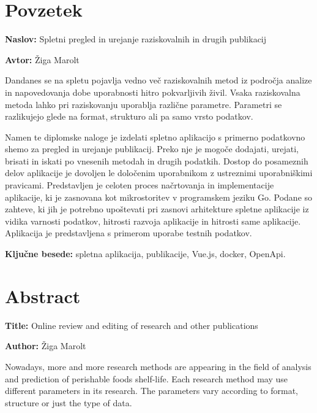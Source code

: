\documentclass[a4paper, 12pt]{book}
\newcommand{\ttitle}{Spletni pregled in urejanje raziskovalnih in drugih publikacij}
\newcommand{\ttitleEn}{Online review and editing of research and other publications}
\newcommand{\tauthor}{Žiga Marolt}
\newcommand{\tkeywords}{spletna aplikacija, publikacije, Vue.js, docker, OpenApi}
\newcommand{\clearemptydoublepage}{\newpage{\pagestyle{empty}\cleardoublepage}}
\begin{document}
\clearemptydoublepage

\chapter*{Povzetek}

\noindent\textbf{Naslov:} \ttitle
\bigskip

\noindent\textbf{Avtor:} \tauthor
\bigskip

\noindent Dandanes se na spletu pojavlja vedno več raziskovalnih metod iz področja analize in napovedovanja dobe uporabnosti hitro pokvarljivih živil. Vsaka raziskovalna metoda lahko pri raziskovanju uporablja različne parametre. Parametri se razlikujejo glede na format, strukturo ali pa samo vrsto podatkov.

Namen te diplomske naloge je izdelati spletno aplikacijo s primerno podatkovno shemo za pregled in urejanje publikacij. Preko nje je mogoče dodajati, urejati, brisati in iskati po vnesenih metodah in drugih podatkih. Dostop do posameznih delov aplikacije je dovoljen le določenim uporabnikom z ustreznimi uporabniškimi pravicami. Predstavljen je celoten proces načrtovanja in implementacije aplikacije, ki je zasnovana kot mikrostoritev v programskem jeziku Go. Podane so zahteve, ki jih je potrebno upoštevati pri zasnovi arhitekture spletne aplikacije iz vidika varnosti podatkov, hitrosti razvoja aplikacije in hitrosti same aplikacije. Aplikacija je predstavljena s primerom uporabe testnih podatkov.

\bigskip

\noindent\textbf{Ključne besede:} \tkeywords.
\clearemptydoublepage

\chapter*{Abstract}

\noindent\textbf{Title:} \ttitleEn
\bigskip

\noindent\textbf{Author:} \tauthor
\bigskip

\noindent Nowadays, more and more research methods are appearing in the field of analysis and prediction of perishable foods shelf-life. Each research method may use different parameters in its research. The parameters vary according to format, structure or just the type of data.
\end{document}
